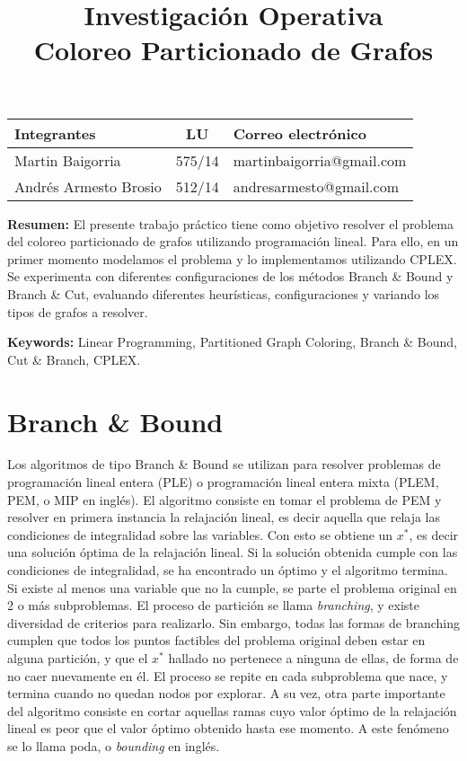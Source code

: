 \documentclass[10pt,a4paper]{article}
\title{Investigación Operativa \\ Coloreo Particionado de Grafos}
\begin{document}

\maketitle

\bigskip

\begin{table}[h]
\centering
\begin{tabular}{|l l l|}
\hline
Integrantes       & \multicolumn{1}{c}{LU}     & Correo electrónico        \\ \hline
Martin Baigorria & \multicolumn{1}{c}{575/14} & martinbaigorria@gmail.com \\ 
Andrés Armesto Brosio & 512/14 & andresarmesto@gmail.com \\  \hline
\end{tabular}
\end{table}

\vfill
\textbf{Resumen:} El presente trabajo práctico tiene como objetivo resolver el problema del coloreo particionado de grafos utilizando programación lineal. Para ello, en un primer momento modelamos el problema y lo implementamos utilizando CPLEX. Se experimenta con diferentes configuraciones de los métodos Branch \& Bound y Branch \& Cut, evaluando diferentes heurísticas, configuraciones y variando los tipos de grafos a resolver.

\textbf{Keywords:} Linear Programming, Partitioned Graph Coloring, Branch \& Bound, Cut \& Branch, CPLEX.

\newpage
\tableofcontents
\newpage



\newpage
\section{Branch \& Bound}

Los algoritmos de tipo Branch \& Bound se utilizan para resolver problemas de programación lineal entera (PLE) o programación lineal entera mixta (PLEM, PEM, o MIP en inglés). El algoritmo consiste en tomar el problema de PEM y resolver en primera instancia la relajación lineal, es decir aquella que relaja las condiciones de integralidad sobre las variables. Con esto se obtiene un $x^*$, es decir una solución óptima de la relajación lineal. Si la solución obtenida cumple con las condiciones de integralidad, se ha encontrado un óptimo y el algoritmo termina. Si existe al menos una variable que no la cumple, se parte el problema original en 2 o más subproblemas. El proceso de partición se llama \textit{branching}, y existe diversidad de criterios para realizarlo. Sin embargo, todas las formas de branching cumplen que todos los puntos factibles del problema original deben estar en alguna partición, y que el $x^*$ hallado no pertenece a ninguna de ellas, de forma de no caer nuevamente en él. El proceso se repite en cada subproblema que nace, y termina cuando no quedan nodos por explorar. A su vez, otra parte importante del algoritmo consiste en cortar aquellas ramas cuyo valor óptimo de la relajación lineal es peor que el valor óptimo obtenido hasta ese momento. A este fenómeno se lo llama poda, o \textit{bounding} en inglés.
\end{document}
